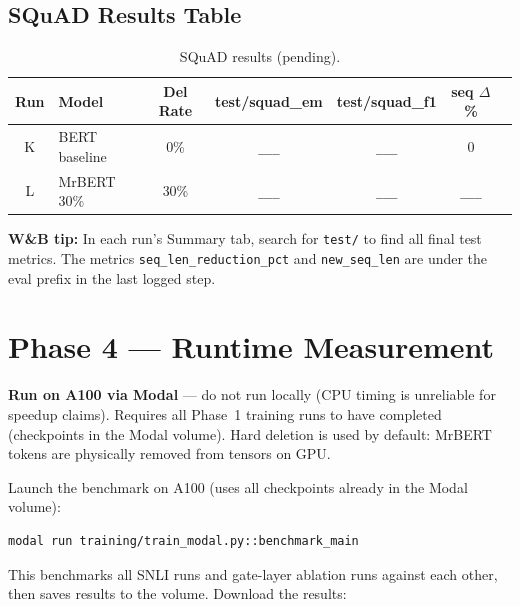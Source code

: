 \documentclass[11pt,a4paper]{article}
\newcommand{\tbd}{\textcolor{placeholder}{\texttt{\_\_\_}}}
\begin{document}
\subsection{SQuAD Results Table}

\begin{table}[h]
\centering
\begin{tabular}{@{}clccccc@{}}
\toprule
\textbf{Run} & \textbf{Model} & \textbf{Del Rate} & \textbf{test/squad\_em} & \textbf{test/squad\_f1} & \textbf{seq $\Delta$\%} \\
\midrule
K & BERT baseline & 0\%  & \tbd & \tbd & 0    \\
L & MrBERT 30\%   & 30\% & \tbd & \tbd & \tbd \\
\bottomrule
\end{tabular}
\caption{SQuAD results (pending).}
\label{tab:squad-results}
\end{table}

\begin{mdframed}[style=notestyle]
\textbf{W\&B tip:} In each run's Summary tab, search for \texttt{test/} to find all final test metrics. The metrics \texttt{seq\_len\_reduction\_pct} and \texttt{new\_seq\_len} are under the eval prefix in the last logged step.
\end{mdframed}


\section{Phase 4 --- Runtime Measurement}
\label{sec:phase4}

\begin{mdframed}[style=notestyle]
\textbf{Run on A100 via Modal} --- do not run locally (CPU timing is unreliable for speedup claims). Requires all Phase~1 training runs to have completed (checkpoints in the Modal volume). Hard deletion is used by default: MrBERT tokens are physically removed from tensors on GPU.
\end{mdframed}

Launch the benchmark on A100 (uses all checkpoints already in the Modal volume):

\begin{lstlisting}
modal run training/train_modal.py::benchmark_main
\end{lstlisting}

This benchmarks all SNLI runs and gate-layer ablation runs against each other, then saves results to the volume. Download the results:
\end{document}
